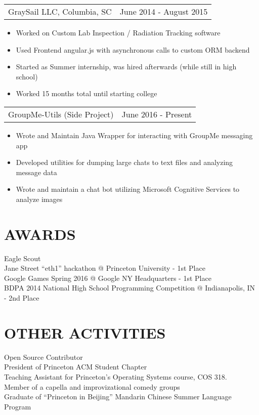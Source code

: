 \documentclass[margin]{res}
\begin{document}
\begin{resume}
    \begin{tabular}{p{3.5in} p{3in}}
        GraySail LLC, Columbia, SC        & June 2014 - August 2015
    \end{tabular}
    \begin{itemize} \itemsep -2pt
        \item Worked on Custom Lab Inspection / Radiation Tracking software
        \item Used Frontend angular.js with asynchronous calls to custom ORM backend
        \item Started as Summer internship, was hired afterwards (while still in high school)
        \item Worked 15 months total until starting college
	\end{itemize}

    \begin{tabular}{p{3.5in} p{3in}}
        GroupMe-Utils (Side Project) & June 2016 - Present
    \end{tabular}
    \begin{itemize} \itemsep -2pt
        \item Wrote and Maintain Java Wrapper for interacting with GroupMe messaging app
        \item Developed utilities for dumping large chats to text files and analyzing message data
        \item Wrote and maintain a chat bot utilizing Microsoft Cognitive Services to analyze images
    \end{itemize}
\section{AWARDS}
            Eagle Scout \\
            Jane Street ``eth1'' hackathon @ Princeton University - 1st Place \\
            Google Games Spring 2016 @ Google NY Headquarters - 1st Place \\
            BDPA 2014 National High School Programming Competition @ Indianapolis, IN - 2nd Place

\section{OTHER ACTIVITIES}
            Open Source Contributor \\
            President of Princeton ACM Student Chapter\\
            Teaching Assistant for Princeton's Operating Systems course, COS 318.\\
            Member of a capella and improvizational comedy groups\\
            Graduate of ``Princeton in Beijing'' Mandarin Chinese Summer Language Program


\end{resume}
\end{document}
